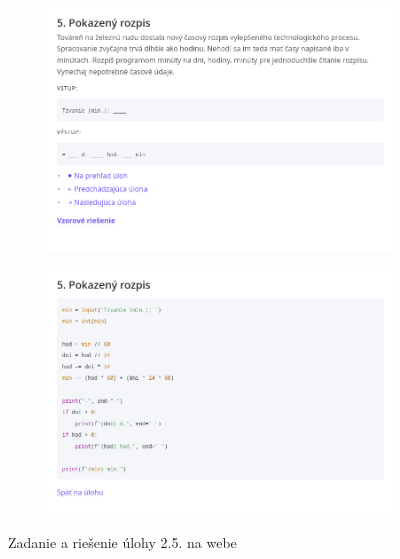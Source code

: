 \begin{figure}[h]
\centering
\begin{subfigure}[b]{0.49\textwidth}
\centering
\includegraphics[width=\textwidth]{assets/web-uloha.png}
\end{subfigure}
\hfill
\begin{subfigure}[b]{0.49\textwidth}
\centering
\includegraphics[width=\textwidth]{assets/web-riesenie.png}
\end{subfigure}
\caption{Zadanie a riešenie úlohy 2.5. na webe}
\end{figure}





